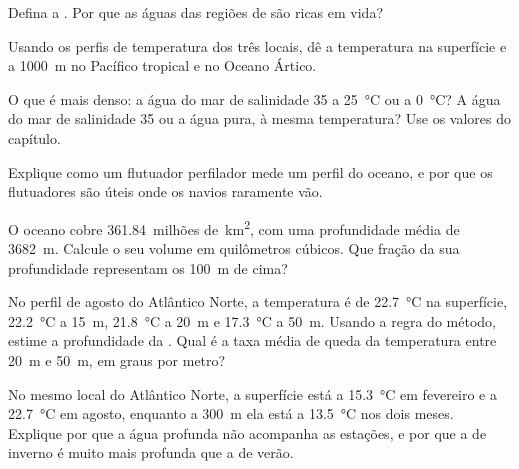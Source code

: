 \begin{exercise}[$\star$]\label{exo:g10:layered-ocean:2}
Defina a . Por que as águas das regiões de  são ricas
em vida?
\end{exercise}

\begin{exercise}[$\star$]\label{exo:g10:layered-ocean:3}
Usando os perfis de temperatura dos três locais, dê a temperatura na
superfície e a \qty{1000}{m} no Pacífico tropical e no Oceano Ártico.
\end{exercise}

\begin{exercise}[$\star$]\label{exo:g10:layered-ocean:4}
O que é mais denso: a água do mar de salinidade 35 a \qty{25}{\degreeCelsius}
ou a \qty{0}{\degreeCelsius}? A água do mar de salinidade 35 ou a água pura,
à mesma temperatura? Use os valores do capítulo.
\end{exercise}

\begin{exercise}[$\star$]\label{exo:g10:layered-ocean:5}
Explique como um flutuador perfilador mede um perfil do oceano, e por que os
flutuadores são úteis onde os navios raramente vão.
\end{exercise}

\begin{exercise}[$\star\star$]\label{exo:g10:layered-ocean:6}
O oceano cobre \num{361.84}~milhões de~\unit{km^2}, com uma profundidade
média de \qty{3682}{m}. Calcule o seu volume em quilômetros cúbicos. Que
fração da sua profundidade representam os \qty{100}{m} de cima?
\end{exercise}

\begin{exercise}[$\star\star$]\label{exo:g10:layered-ocean:7}
No perfil de agosto do Atlântico Norte, a temperatura é de
\qty{22.7}{\degreeCelsius} na superfície, \qty{22.2}{\degreeCelsius} a
\qty{15}{m}, \qty{21.8}{\degreeCelsius} a \qty{20}{m} e
\qty{17.3}{\degreeCelsius} a \qty{50}{m}. Usando a regra do método, estime
a profundidade da . Qual é a taxa média de queda da
temperatura entre \qty{20}{m} e \qty{50}{m}, em graus por metro?
\end{exercise}

\begin{exercise}[$\star\star$]\label{exo:g10:layered-ocean:8}
No mesmo local do Atlântico Norte, a superfície está a
\qty{15.3}{\degreeCelsius} em fevereiro e a \qty{22.7}{\degreeCelsius} em
agosto, enquanto a \qty{300}{m} ela está a \qty{13.5}{\degreeCelsius} nos
dois meses. Explique por que a água profunda não acompanha as estações, e
por que a  de inverno é muito mais profunda que a de verão.
\end{exercise}

